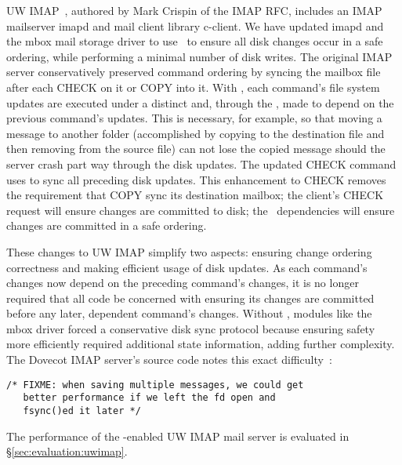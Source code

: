 UW IMAP~\cite{uwimap}, authored by Mark Crispin of the IMAP RFC,
includes an IMAP mailserver imapd and mail client library c-client.
We have updated imapd and the mbox mail storage driver to use
\opgroups\ to ensure all disk changes occur in a safe ordering, while
performing a minimal number of disk writes.
%
The original IMAP server conservatively preserved command ordering by
syncing the mailbox file after each CHECK on it or COPY into it. With
\opgroups, each command's file system updates are executed under a
distinct \opgroup and, through the \opgroup, made to depend on the
previous command's updates. This is necessary, for example, so that
moving a message to another folder (accomplished by copying to the
destination file and then removing from the source file) can not lose
the copied message should the server crash part way through the disk
updates.
%
The updated CHECK command uses \opgroupSync to sync all preceding disk
updates. This enhancement to CHECK removes the requirement that COPY
sync its destination mailbox; the client's CHECK request will ensure
changes are committed to disk; the \opgroup\ dependencies will ensure
changes are committed in a safe ordering.

These changes to UW IMAP simplify two aspects:
%
ensuring change ordering correctness
%
and making efficient usage of disk updates.
%
As each command's changes now depend on the preceding command's
changes, it is no longer required that all code be concerned with
ensuring its changes are committed before any later, dependent
command's changes. Without \opgroups, modules like the mbox driver
forced a conservative disk sync protocol because ensuring safety more
efficiently required additional state information, adding further
complexity. The Dovecot IMAP server's source code notes this exact
difficulty~\cite[maildir-save.c]{dovecot}:

\vspace{-0.5\baselineskip}
\begin{scriptsize}
\begin{verbatim}
/* FIXME: when saving multiple messages, we could get
   better performance if we left the fd open and
   fsync()ed it later */
\end{verbatim}
\end{scriptsize}
\vspace{-0.5\baselineskip}

The performance of the \opgroup{}-enabled UW IMAP mail server is
evaluated in \S\ref{sec:evaluation:uwimap}.
